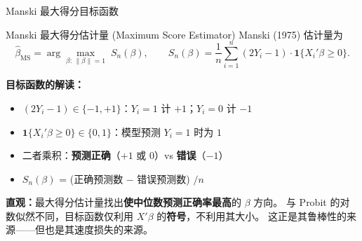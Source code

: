 \documentclass[aspectratio=169, 10pt]{beamer}
\begin{document}
\begin{frame}[shrink=10]{Manski 最大得分目标函数}

  \begin{definitionbox}{{Manski 最大得分估计量 (Maximum Score Estimator)}}
    Manski (1975) 估计量为
    $$\hat\beta_{\text{MS}} = \arg\max_{\beta:\, \|\beta\|=1}
    \;S_n(\beta), \qquad
    S_n(\beta) = \frac{1}{n}\sum_{i=1}^n
    (2Y_i - 1) \cdot \mathbf{1}\{X_i'\beta \geq 0\}.$$
  \end{definitionbox}

  \begin{highlightbox}
    \textbf{目标函数的解读：}
    \begin{itemize}\setlength{\itemsep}{1pt}
      \item $(2Y_i - 1) \in \{-1, +1\}$：$Y_i = 1$ 计 $+1$；$Y_i = 0$ 计 $-1$
      \item $\mathbf{1}\{X_i'\beta \geq 0\} \in \{0, 1\}$：模型预测 $Y_i = 1$ 时为 $1$
      \item 二者乘积：\textbf{预测正确}（$+1$ 或 $0$）vs \textbf{错误}（$-1$）
      \item $S_n(\beta)$ = (正确预测数 $-$ 错误预测数) $/ n$
    \end{itemize}
  \end{highlightbox}

  \begin{keybox}
    \textbf{直观：}最大得分估计量找出\textbf{使中位数预测正确率最高}的 $\beta$ 方向。
    与 Probit 的对数似然不同，目标函数仅利用 $X'\beta$ 的\textbf{符号}，不利用其大小。
    这正是其鲁棒性的来源——但也是其速度损失的来源。
  \end{keybox}

\end{frame}
\end{document}
